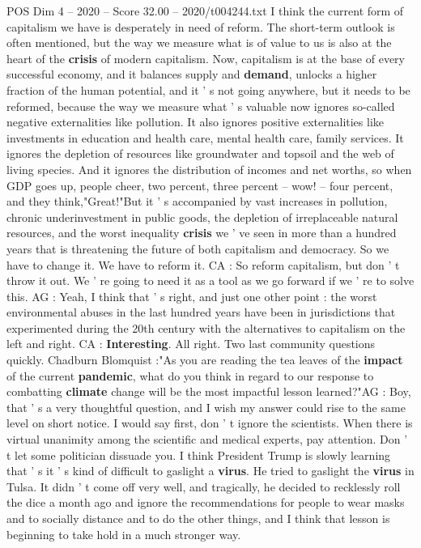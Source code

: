 \begin{textsample}{POS Dim 4 – 2020 – Score 32.00 – 2020/t004244.txt}
I think the current form of capitalism we have is desperately in need of reform.
The short-term outlook is often mentioned, but the way we measure what is of value to us is also at the heart of the \textbf{crisis} of modern capitalism.
Now, capitalism is at the base of every successful economy, and it balances supply and \textbf{demand}, unlocks a higher fraction of the human potential, and it ' s not going anywhere, but it needs to be reformed, because the way we measure what ' s valuable now ignores so-called negative externalities like pollution.
It also ignores positive externalities like investments in education and health care, mental health care, family services.
It ignores the depletion of resources like groundwater and topsoil and the web of living species.
And it ignores the distribution of incomes and net worths, so when GDP goes up, people cheer, two percent, three percent -- wow! -- four percent, and they think,"Great!"But it ' s accompanied by vast increases in pollution, chronic underinvestment in public goods, the depletion of irreplaceable natural resources, and the worst inequality \textbf{crisis} we ' ve seen in more than a hundred years that is threatening the future of both capitalism and democracy.
So we have to change it.
We have to reform it.
CA : So reform capitalism, but don ' t throw it out.
We ' re going to need it as a tool as we go forward if we ' re to solve this.
AG : Yeah, I think that ' s right, and just one other point : the worst environmental abuses in the last hundred years have been in jurisdictions that experimented during the 20th century with the alternatives to capitalism on the left and right.
CA : \textbf{Interesting}.
All right.
Two last community questions quickly.
Chadburn Blomquist :"As you are reading the tea leaves of the \textbf{impact} of the current \textbf{pandemic}, what do you think in regard to our response to combatting \textbf{climate} change will be the most impactful lesson learned?"AG : Boy, that ' s a very thoughtful question, and I wish my answer could rise to the same level on short notice.
I would say first, don ' t ignore the scientists.
When there is virtual unanimity among the scientific and medical experts, pay attention.
Don ' t let some politician dissuade you.
I think President Trump is slowly learning that ' s it ' s kind of difficult to gaslight a \textbf{virus}.
He tried to gaslight the \textbf{virus} in Tulsa.
It didn ' t come off very well, and tragically, he decided to recklessly roll the dice a month ago and ignore the recommendations for people to wear masks and to socially distance and to do the other things, and I think that lesson is beginning to take hold in a much stronger way.

\end{textsample}

